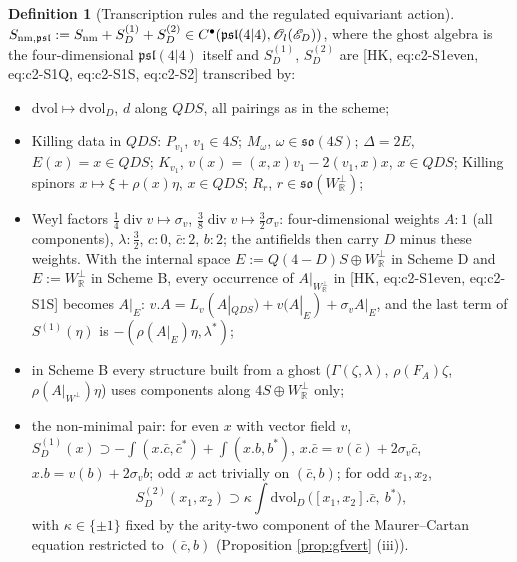 \documentclass[11pt]{article}
\theoremstyle{definition}
\newtheorem{definition}{Definition}[section]
\numberwithin{equation}{section}
\begin{document}
\begin{definition}[Transcription rules and the regulated equivariant action]
\label{def:equiv}
$S_{{\rm nm},\mathfrak{psl}}:=S_{\rm nm}+S^{(1)}_D+S^{(2)}_D\in C^\bullet(\mathfrak{psl}(4|4),\mathscr O_l(\mathscr E_D))$, where the ghost algebra is the four-dimensional $\mathfrak{psl}(4|4)$ itself and $S^{(1)}_D$, $S^{(2)}_D$ are [HK, eq:c2-S1even, eq:c2-S1Q, eq:c2-S1S, eq:c2-S2] transcribed by:
\begin{itemize}
\item[T1] $\mathrm{dvol}\mapsto\mathrm{dvol}_D$, $d$ along $QDS$, all pairings as in the scheme;
\item[T2] Killing data in $QDS$: $P_{v_1}$, $v_1\in 4S$; $M_\omega$, $\omega\in\mathfrak{so}(4S)$; $\Delta=2E$, $E(x)=x\in QDS$; $K_{v_1}$, $v(x)=(x,x)v_1-2(v_1,x)x$, $x\in QDS$; Killing spinors $x\mapsto\xi+\rho(x)\eta$, $x\in QDS$; $R_r$, $r\in\mathfrak{so}(W^\perp_{\mathbb R})$;
\item[T3] Weyl factors $\frac14\operatorname{div}v\mapsto\sigma_v$, $\frac38\operatorname{div}v\mapsto\frac32\sigma_v$: four-dimensional weights $A\colon1$ (all components), $\lambda\colon\frac32$, $c\colon0$, $\bar c\colon2$, $b\colon2$; the antifields then carry $D$ minus these weights. With the internal space $E:=Q(4{-}D)S\oplus W^\perp_{\mathbb R}$ in Scheme D and $E:=W^\perp_{\mathbb R}$ in Scheme B, every occurrence of $A|_{W^\perp_{\mathbb R}}$ in [HK, eq:c2-S1even, eq:c2-S1S] becomes $A|_E$: $v.A=L_v(A|_{QDS})+v(A|_E)+\sigma_vA|_E$, and the last term of $S^{(1)}(\eta)$ is $-(\rho(A|_E)\eta,\lambda^*)$;
\item[T4] in Scheme B every structure built from a ghost ($\Gamma(\zeta,\lambda)$, $\rho(F_A)\zeta$, $\rho(A|_{W^\perp})\eta$) uses components along $4S\oplus W^\perp_{\mathbb R}$ only;
\item[T5] the non-minimal pair: for even $x$ with vector field $v$, $S^{(1)}_D(x)\supset-\int(x.\bar c,\bar c^*)+\int(x.b,b^*)$, $x.\bar c=v(\bar c)+2\sigma_v\bar c$, $x.b=v(b)+2\sigma_vb$; odd $x$ act trivially on $(\bar c,b)$; for odd $x_1,x_2$,
\[
S^{(2)}_D(x_1,x_2)\supset\kappa\int\mathrm{dvol}_D\,\big([x_1,x_2].\bar c,\ b^*\big),
\]
with $\kappa\in\{\pm1\}$ fixed by the arity-two component of the Maurer--Cartan equation restricted to $(\bar c,b)$ (Proposition \ref{prop:gfvert} (iii)).
\end{itemize}
\end{definition}
\end{document}
